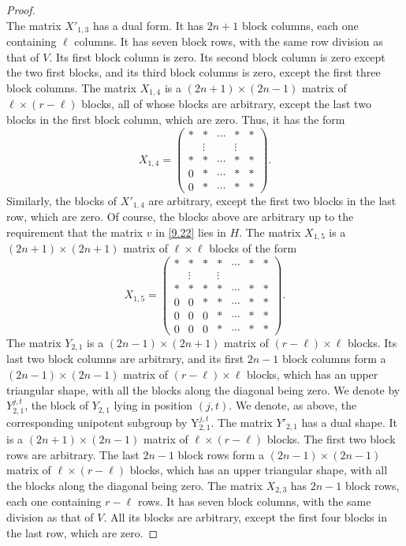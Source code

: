 \documentclass[12pts]{amsart}
\begin{document}
\begin{proof}
\begin{equation}
\end{equation}
The matrix $X'_{1,3}$ has a dual form. It has $2n+1$ block columns, each one containing $\ell$ columns. It has seven block rows, with the same row division as that of $V$. Its first block column is zero. Its second block column is zero except the two first blocks, and its third block columns is zero, except the first three block columns. The matrix $X_{1,4}$ is a $(2n+1)\times (2n-1)$ matrix of $\ell\times (r-\ell)$ blocks, all of whose blocks are arbitrary, except the last two blocks in the first block column, which are zero. Thus, it has the form
\begin{equation}\label{9.27}
X_{1,4}=\begin{pmatrix}\ast&\ast&\cdots&\ast&\ast\\
&\vdots&&\vdots\\\ast&\ast&\cdots&\ast&\ast\\0&\ast&\cdots&\ast&\ast\\0&\ast&\cdots&\ast&\ast\end{pmatrix}.
\end{equation}
Similarly, the blocks of $X'_{1,4}$ are arbitrary, except the first two blocks in the last row, which are zero. Of course, the blocks above are arbitrary up to the requirement that the matrix $v$ in \eqref{9.22} lies in $H$. The matrix $X_{1,5}$ is a $(2n+1)\times (2n+1)$ matrix of $\ell\times \ell$ blocks of the form
\begin{equation}\label{9.28}
X_{1,5}=\begin{pmatrix}\ast&\ast&\ast&\ast&\cdots&\ast&\ast\\
&\vdots&&\vdots\\\ast&\ast&\ast&\ast&\cdots&\ast&\ast\\0&0&\ast&\ast&\cdots&\ast&\ast\\0&0&0&\ast&\cdots&\ast&\ast\\0&0&0&\ast&\cdots&\ast&\ast\end{pmatrix}.
\end{equation}
The matrix $Y_{2,1}$ is a $(2n-1)\times (2n+1)$ matrix of $(r-\ell)\times\ell$ blocks. Its last two block columns are arbitrary, and its first $2n-1$ block columns form a $(2n-1)\times (2n-1)$ matrix of $(r-\ell)\times \ell$ blocks, which has an upper triangular shape, with all the blocks along the diagonal being zero. We denote by $Y_{2,1}^{j,t}$, the block of $Y_{2,1}$ lying in position $(j,t)$. We denote, as above, the corresponding unipotent subgroup by $\mathrm{Y}_{2,1}^{j,t}$. The matrix $Y'_{2,1}$ has a dual shape. It is a $(2n+1)\times (2n-1)$ matrix of $\ell\times (r-\ell)$ blocks. The first two block rows are arbitrary. The last $2n-1$ block rows form a $(2n-1)\times (2n-1)$ matrix of $\ell\times (r-\ell)$ blocks, which has an upper triangular shape, with all the blocks along the diagonal being zero. The matrix $X_{2,3}$ has $2n-1$ block rows, each one containing $r-\ell$ rows. It has seven block columns, with the same division as that of $V$. All its blocks are arbitrary, except the first four blocks in the last row, which are zero.

\end{proof}
\end{document}

